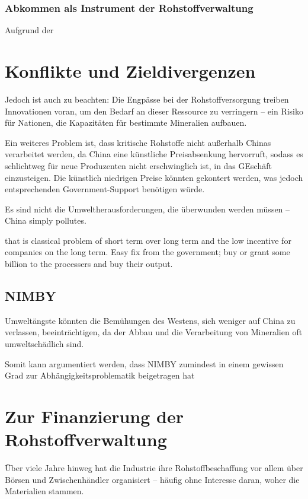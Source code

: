 \documentclass[12pt,a4paper,oneside]{book} %
\begin{document}
\subsubsection{Abkommen als Instrument der Rohstoffverwaltung}


Aufgrund der 



\section{Konflikte und Zieldivergenzen}

Jedoch ist auch zu beachten: Die Engpässe bei der Rohstoffversorgung treiben Innovationen voran, um den Bedarf an dieser Ressource zu verringern – ein Risiko für Nationen, die Kapazitäten für bestimmte Mineralien aufbauen.

Ein weiteres Problem ist, dass kritische Rohstoffe nicht außerhalb Chinas verarbeitet werden, da China eine künstliche Preisabsenkung hervorruft, sodass es schlichtweg für neue Produzenten nicht erschwinglich ist, in das GEschäft einzusteigen. Die künstlich niedrigen Preise könnten gekontert werden, was jedoch entsprechenden Government-Support benötigen würde.

Es sind nicht die Umweltherausforderungen, die überwunden werden müssen -- China simply pollutes.



that is classical problem of short term over long term and the low incentive for companies on the long term. Easy fix from the government; buy or grant some billion to the processers and buy their output.


\subsection{NIMBY}

Umweltängste könnten die Bemühungen des Westens, sich weniger auf China zu verlassen, beeinträchtigen, da der Abbau und die Verarbeitung von Mineralien oft umweltschädlich sind.

Somit kann argumentiert werden, dass NIMBY zumindest in einem gewissen Grad zur Abhängigkeitsproblematik beigetragen hat

\section{Zur Finanzierung der Rohstoffverwaltung}

Über viele Jahre hinweg hat die Industrie ihre Rohstoffbeschaffung vor allem über Börsen und Zwischenhändler organisiert – häufig ohne Interesse daran, woher die Materialien stammen.\autocite{https://www.africa-business-guide.de/de/praxis/erfahrungen/schluesselrolle-afrikas-bedeutung-bei-den-kritischen-rohstoffen--1920084}
\end{document}
